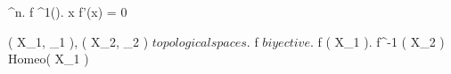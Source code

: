 	{
		{
			\Uc \subset \R^n.
			f \in \Cc^1(\Uc).
			x \in \Uc
		}
		{
			f'(x) = 0
		}
	}


	
	{
		{
			( X_1, \tau_1 ), ( X_2, \tau_2 ) $ topological spaces $.
		}
		{
			f $ biyective $.
			f \in \Cc( X_1 ).
			f^{-1} \in \Cc( X_2 )			
		}
		\denote
		{
			 \as Homeo( X_1 )
		}
	}
